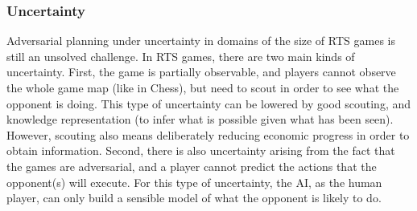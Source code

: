 \documentclass{llncs}
\begin{document}
\subsubsection*{Uncertainty}
Adversarial planning under  uncertainty in domains of the  size of RTS
games is  still an unsolved  challenge.  In  RTS games, there  are two
main kinds  of uncertainty. First,  the game is  partially observable,
and players  cannot observe the  whole game  map (like in  Chess), but
need to scout in order to see what the opponent is doing. This type of
uncertainty   can  be   lowered  by   good  scouting,   and  knowledge
representation  (to  infer  what  is  possible  given  what  has  been
seen). However, scouting also means deliberately reducing economic progress in order to obtain information.
Second,  there is also  uncertainty arising from the  fact that
the games  are adversarial,  and a player  cannot predict  the actions
that the opponent(s)  will execute. For this type  of uncertainty, the
AI, as the human  player, can only build a sensible  model of what the
opponent is likely to do.
\end{document}
